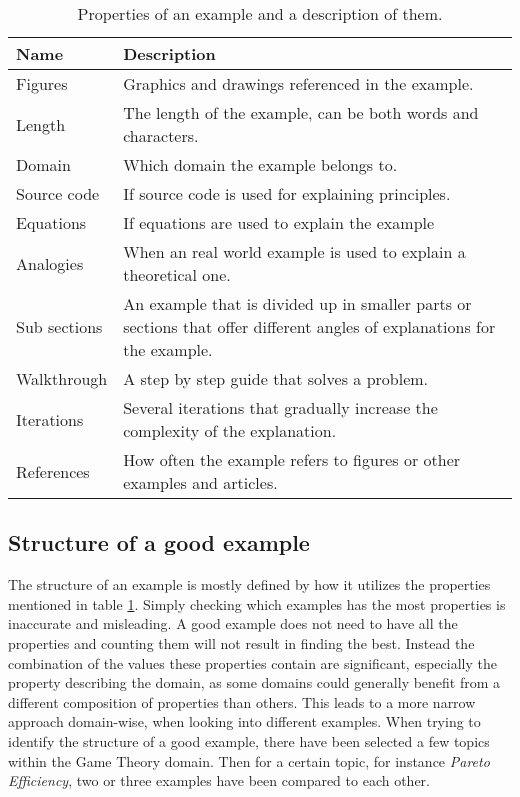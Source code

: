 \begin{table}[h!]
\centering
\begin{tabular} {|| p{5em} | p{23em} ||} 
 \hline
 Name & Description \\ [0.5ex] 
 \hline\hline
 Figures & Graphics and drawings referenced in the example. \\ 
 Length & The length of the example, can be both words and characters. \\
 Domain & Which domain the example belongs to. \\
 Source code & If source code is used for explaining principles. \\
 Equations & If equations are used to explain the example \\
 Analogies & When an real world example is used to explain a theoretical one. \\
 Sub sections & An example that is divided up in smaller parts or sections that offer different angles of explanations for the example. \\
 Walkthrough & A step by step guide that solves a problem. \\
 Iterations & Several iterations that gradually increase the complexity of the explanation. \\
 References & How often the example refers to figures or other examples and articles. \\ [1ex] 
 \hline
\end{tabular}
\caption{Properties of an example and a description of them.}
\label{table:1}
\end{table}


\subsection{Structure of a good example} \label{good_example}

The structure of an example is mostly defined by how it utilizes the properties mentioned in table \ref{table:1}. Simply checking which examples has the most properties is inaccurate and misleading. A good example does not need to have all the properties and counting them will not result in finding the best.
Instead the combination of the values these properties contain are significant, especially the property describing the domain, as some domains could generally benefit from a different composition of properties than others. This leads to a more narrow approach domain-wise, when looking into different examples.
When trying to identify the structure of a good example, there have been selected a few topics within the Game Theory domain. Then for a certain topic, for instance \textit{Pareto Efficiency}, two or three examples have been compared to each other.

